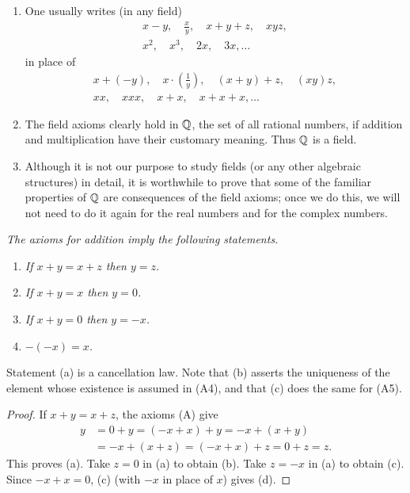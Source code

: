 \begin{enumerate}[label=(\alph*), leftmargin=2.2em, itemsep=5pt, topsep=4pt]
  \item One usually writes (in any field)
        \begin{gather*}
          x-y, \quad \frac{x}{y}, \quad x+y+z, \quad xyz,\\
          x^2, \quad x^3, \quad 2x, \quad 3x, \dots
        \end{gather*}
        in place of
        \begin{gather*}
          x+(-y), \quad x\cdot\left(\frac{1}{y}\right), \quad (x+y)+z,
          \quad (xy)z,\\
          xx, \quad xxx, \quad x+x, \quad x+x+x, \dots
        \end{gather*}
  \item The field axioms clearly hold in $\mathbb{Q}$, the set of all rational numbers,
        if addition and multiplication have their customary meaning. Thus $\mathbb{Q}$
        is a field.
  \item Although it is not our purpose to study fields (or any other algebraic
        structures) in detail, it is worthwhile to prove that some of the
        familiar properties of $\mathbb{Q}$ are consequences of the field axioms; once
        we do this, we will not need to do it again for the real numbers and for
        the complex numbers.
\end{enumerate}

\emph{The axioms for addition imply the following statements.}
\begin{enumerate}[label=(\alph*), leftmargin=2.2em, itemsep=1pt, topsep=3pt]
  \item \emph{If $x+y = x+z$ then $y = z$.}
  \item \emph{If $x+y = x$ then $y = 0$.}
  \item \emph{If $x+y = 0$ then $y = -x$.}
  \item \emph{$-(-x) = x$.}
\end{enumerate}
Statement (a) is a cancellation law. Note that (b) asserts the uniqueness of the
element whose existence is assumed in (A4), and that (c) does the same for
(A5).

\begin{proof}
If $x+y = x+z$, the axioms (A) give
\begin{align*}
  y &= 0 + y = (-x+x)+y = -x + (x+y)\\
    &= -x + (x+z) = (-x+x)+z = 0+z = z.
\end{align*}
This proves (a). Take $z = 0$ in (a) to obtain (b). Take $z = -x$ in (a) to
obtain (c). Since $-x+x = 0$, (c) (with $-x$ in place of $x$) gives (d).
\end{proof}

